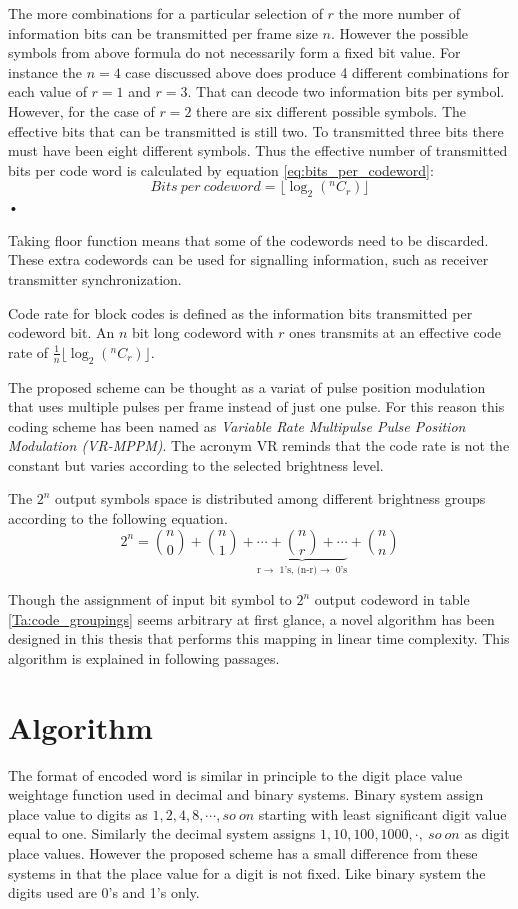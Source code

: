 The more combinations for a particular selection of $r$ the more number of information bits can be transmitted per frame size $n$. However the possible symbols from above formula do not necessarily form a fixed bit value. For instance the $n=4$ case discussed above does produce 4 different combinations for each value of $r=1$ and $r=3$. That can decode two information bits per symbol. However, for the case of $r=2$ there are six different possible symbols.  The effective bits that can be transmitted is still two. To transmitted three bits there must have been eight different symbols. Thus the effective number of transmitted bits per code word is calculated by equation \ref{eq:bits_per_codeword}:
\begin{equation}
Bits~per~codeword = \lfloor \log_2(^nC_r) \rfloor
\label{eq:bits_per_codeword}
\end{equation}•

Taking floor function means that some of the codewords need to be discarded. These extra codewords can be used for signalling information, such as receiver transmitter synchronization. 

Code rate for block codes is defined as the information bits transmitted per codeword bit. An $n$ bit long codeword with $r$ ones transmits at an effective code rate of $\frac{1}{n}\lfloor \log_2(^nC_r) \rfloor$. 

The proposed scheme can be thought as a variat of pulse position modulation that uses multiple pulses per frame instead of just one pulse. For this reason this coding scheme has been named as \emph{Variable Rate Multipulse Pulse Position Modulation (VR-MPPM)}. The acronym VR reminds that the code rate is not the constant but varies according to the selected brightness level.

The $2^n$ output symbols space is distributed among different brightness groups according to the following equation.
\[ 2^n=\binom{n}{0}+\binom{n}{1}+\underbrace{\cdots+ \binom{n}{r} +\cdots}_\text{r$\rightarrow$ 1's, (n-r)$\rightarrow$ 0's}+\binom{n}{n} \]

Though the assignment of input bit symbol to $2^n$ output codeword in table \ref{Ta:code_groupings} seems arbitrary at first glance, a novel algorithm has been designed in this thesis that performs this mapping in linear time complexity. This algorithm is explained in following passages.

\section{Algorithm}
The format of encoded word is similar in principle to the digit place value weightage function used in decimal and binary systems. Binary system assign place value to digits as $1,2,4,8,\cdots,so~on$ starting with least significant digit value equal to one. Similarly the decimal system assigns $1,10,100,1000,\cdot,~so~on$ as digit place values. However the proposed scheme has a small difference from these systems in that the place value for a digit is not fixed. Like binary system the digits used are 0's and 1's only. 

